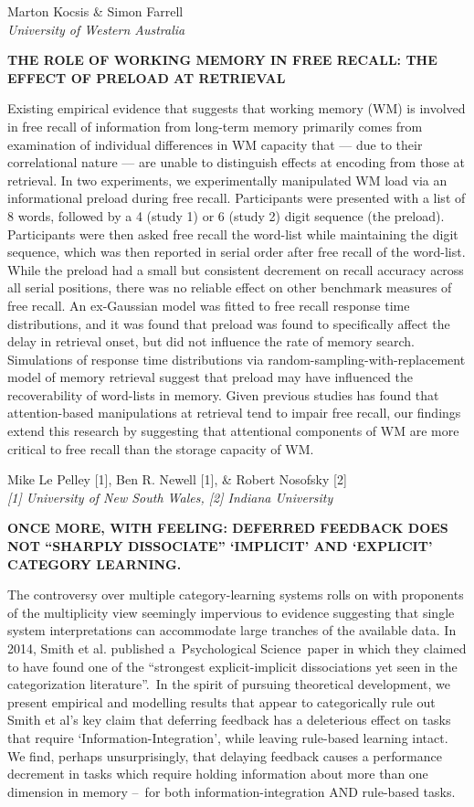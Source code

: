 \documentclass[]{article}
\begin{document}
Marton Kocsis \& Simon Farrell\\
\emph{University of Western Australia}

\textbf{THE ROLE OF WORKING MEMORY IN FREE RECALL: THE EFFECT OF PRELOAD
AT RETRIEVAL}

Existing empirical evidence that suggests that working memory (WM) is
involved in free recall of information from long-term memory primarily
comes from examination of individual differences in WM capacity that ---
due to their correlational nature --- are unable to distinguish effects
at encoding from those at retrieval. In two experiments, we
experimentally manipulated WM load via an informational preload during
free recall. Participants were presented with a list of 8 words,
followed by a 4 (study 1) or 6 (study 2) digit sequence (the preload).
Participants were then asked free recall the word-list while maintaining
the digit sequence, which was then reported in serial order after free
recall of the word-list. While the preload had a small but consistent
decrement on recall accuracy across all serial positions, there was no
reliable effect on other benchmark measures of free recall. An
ex-Gaussian model was fitted to free recall response time distributions,
and it was found that preload was found to specifically affect the delay
in retrieval onset, but did not influence the rate of memory search.
Simulations of response time distributions via
random-sampling-with-replacement model of memory retrieval suggest that
preload may have influenced the recoverability of word-lists in memory.
Given previous studies has found that attention-based manipulations at
retrieval tend to impair free recall, our findings extend this research
by suggesting that attentional components of WM are more critical to
free recall than the storage capacity of WM.\\
\pagebreak  

Mike Le Pelley {[}1{]}, Ben R. Newell {[}1{]}, \& Robert Nosofsky
{[}2{]}\\
\emph{{[}1{]} University of New South Wales, {[}2{]} Indiana University}

\textbf{ONCE MORE, WITH FEELING: DEFERRED FEEDBACK DOES NOT ``SHARPLY
DISSOCIATE'' `IMPLICIT' AND `EXPLICIT' CATEGORY LEARNING.}

The controversy over multiple category-learning systems rolls on with
proponents of the multiplicity view seemingly impervious to evidence
suggesting that single system interpretations can accommodate large
tranches of the available data. In 2014, Smith et al. published
a~Psychological Science~paper in which they claimed to have found one of
the ``strongest explicit-implicit dissociations yet seen in the
categorization literature''.~In the spirit of pursuing theoretical
development, we present empirical and modelling results that appear to
categorically rule out Smith et al's key claim that deferring feedback
has a deleterious effect on tasks that require
`Information-Integration', while leaving rule-based learning intact. We
find, perhaps unsurprisingly, that delaying feedback causes a
performance decrement in tasks which require holding information about
more than one dimension in memory --~for both information-integration
AND rule-based tasks.\\
\pagebreak  
\end{document}
